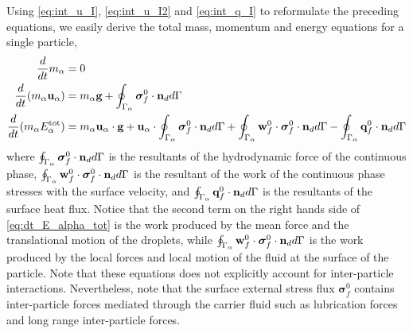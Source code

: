 Using \ref{eq:int_u_I}, \ref{eq:int_u_I2} and \ref{eq:int_q_I} to reformulate the preceding equations, we easily derive the total mass, momentum and energy equations for a single particle, 
\begin{align}
    \label{eq:dt_m_alpha}
    \frac{d}{dt} m_\alpha
    &= 
    0\\
    \label{eq:dt_p_alpha}
    \frac{d}{dt} (m_\alpha \textbf{u}_\alpha)
    &= 
    m_\alpha\textbf{g}
    +  \oint_{\Gamma_\alpha} \bm{\sigma}_f^0 \cdot \textbf{n}_d d\Gamma\\
    \label{eq:dt_E_alpha_tot}
    \frac{d}{dt} (m_\alpha E_\alpha^\text{tot})
    &= 
    m_\alpha \textbf{u}_\alpha \cdot \textbf{g}
    +\textbf{u}_\alpha \cdot \oint_{\Gamma_\alpha} \bm{\sigma}_f^0 \cdot \textbf{n}_d d\Gamma
    +\oint_{\Gamma_\alpha} \textbf{w}_f^0 \cdot \bm{\sigma}_f^0 \cdot  \textbf{n}_d d\Gamma 
    - \oint_{\Gamma_\alpha} \textbf{q}_f^0 \cdot \textbf{n}_d d\Gamma
\end{align}
where  $\oint_{\Gamma_\alpha}   \bm{\sigma}_f^0 \cdot \textbf{n}_d  d\Gamma$ is the resultants of the hydrodynamic force of the continuous phase, $\oint_{\Gamma_\alpha} \textbf{w}_f^0 \cdot \bm{\sigma}_f^0 \cdot  \textbf{n}_d d\Gamma $ is the resultant of the work of the continuous phase stresses with the surface velocity, and $\oint_{\Gamma_\alpha}  \textbf{q}_f^0 \cdot \textbf{n}_d  d\Gamma$ is the resultants of the surface heat flux. 
Notice that the second term on the right hands side of \ref{eq:dt_E_alpha_tot} is the work produced by the mean force and the translational motion of the droplets, while $\oint_{\Gamma_\alpha} \textbf{w}_f^0 \cdot \bm{\sigma}_f^0 \cdot  \textbf{n}_d d\Gamma$ is the work produced by the local forces and local motion of the fluid at the surface of the particle.
Note that these equations does not explicitly account for inter-particle interactions. 
Nevertheless, note that the surface external stress flux $\bm{\sigma}_f^0$ contains inter-particle forces mediated through the carrier fluid such as lubrication forces and long range inter-particle forces.

